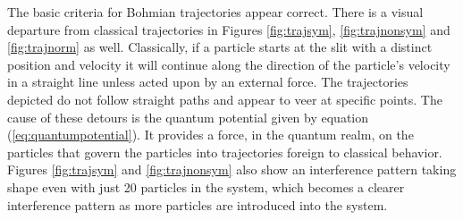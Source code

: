 \documentclass[10pt, reqno]{article}
\begin{document}
  The basic criteria for Bohmian trajectories appear correct.
  There is a visual departure from classical trajectories in Figures \ref{fig:trajsym}, \ref{fig:trajnonsym} and \ref{fig:trajnorm} as well.
  Classically, if a particle starts at the slit with a distinct position and velocity it will continue along the direction of the
    particle's velocity in a straight line unless acted upon by an external force.
  The trajectories depicted do not follow straight paths and appear to veer at specific points.
  The cause of these detours is the quantum potential given by equation (\ref{eq:quantumpotential}).
  It provides a force, in the quantum realm, on the particles that govern the particles into trajectories foreign to classical behavior.
  Figures \ref{fig:trajsym} and \ref{fig:trajnonsym} also show an interference pattern taking shape even with just 20 particles in the system,
    which becomes a clearer interference pattern as more particles are introduced into the system.
\end{document}
